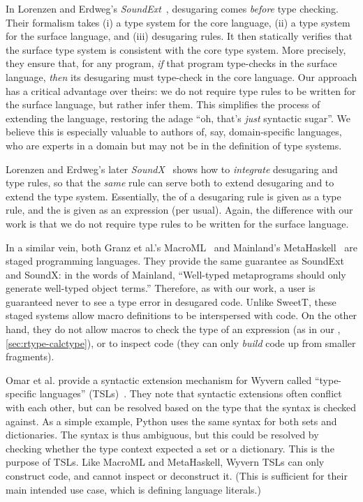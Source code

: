 In Lorenzen and Erdweg's \emph{SoundExt}~\cite{SoundExt},
desugaring comes \emph{before} type checking.
Their formalism takes (i) a
type system for the core language, (ii) a type system for the surface
language, and (iii) desugaring rules. It then statically verifies that
the surface type system is consistent with the core type system.  More
precisely, they ensure that, for any program, \emph{if} that program
type-checks in the surface language, \emph{then} its desugaring must
type-check in the core language. Our approach has a critical
advantage over theirs: we do not require
type rules to be written for the surface language, but rather infer
them. This simplifies the process of extending the language, restoring
the adage ``oh, that's \emph{just} syntactic sugar''. We believe this
is especially valuable to authors of, say, domain-specific languages,
who are experts in a domain but may not be in the definition of type
systems.

Lorenzen and Erdweg's later \emph{SoundX}~\cite{SoundX} shows how
to \emph{integrate} desugaring and
type rules, so that the \emph{same} rule can serve both to extend
desugaring and to extend the type system. Essentially, the  of
a desugaring rule is given as a type rule, and the  is given as
an expression (per usual). Again, the difference with our work is that
we do not require type rules to be written for the surface language.


In a similar vein, both Granz et al.'s MacroML~\cite{MacroML} and Mainland's
MetaHaskell~\cite{MetaHaskell} are staged programming languages. They provide
the same guarantee as SoundExt and SoundX: in the words of Mainland, ``Well-typed
metaprograms should only generate well-typed object terms.''
Therefore, as with our work, a user is guaranteed never to see a type
error in desugared code.  Unlike SweetT, these staged systems allow macro
definitions to be interspersed with code. On the other hand, they do
not allow macros to check the type of an expression (as in our
, \cref{sec:rtype-calctype}), or to inspect code (they can
only \emph{build} code up from smaller fragments).

Omar et al. provide a syntactic extension mechanism for Wyvern called
``type-specific languages'' (TSLs)~\cite{Wyvern-TSL}. They note that syntactic extensions often
conflict with each other, but can be resolved based on the type that
the syntax is checked against. As a simple example, Python uses
the same syntax  for both sets and dictionaries. The syntax
\Code{\{\}} is thus ambiguous, but this could be resolved by checking
whether the type context expected a set or a dictionary. This is the
purpose of TSLs. Like MacroML and MetaHaskell, Wyvern TSLs can only
construct code, and cannot inspect or deconstruct it. (This is
sufficient for their main intended use case, which is defining
language literals.)

